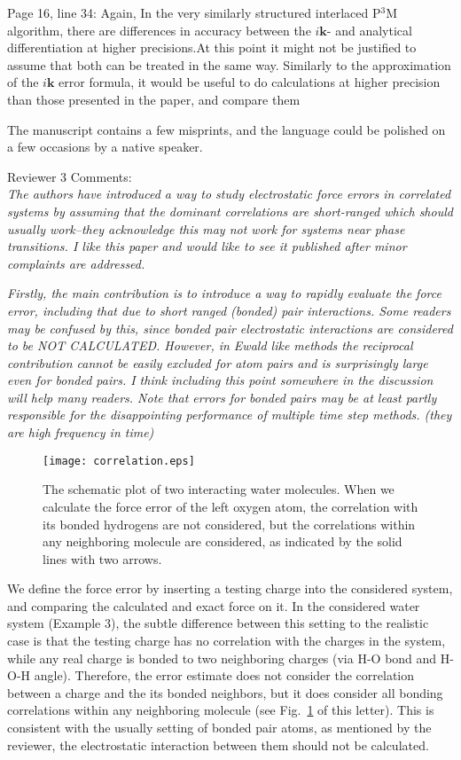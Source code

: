 \documentclass[a4paper]{article}
\begin{document}
Page 16, line 34:
Again, In the very similarly structured interlaced P$^3$M algorithm,  there are differences in accuracy between the $i\mathbf{k}$- and analytical differentiation at higher precisions.At this point it might not be justified  to assume that both can be treated in the same way. Similarly to the approximation of the $i\mathbf{k}$ error formula, it would be useful to do calculations at higher precision than those presented in the paper, and compare them

The manuscript contains a few misprints, and the language could be polished on a few occasions by a native speaker.



\vskip 1cm
\noindent
Reviewer 3 Comments:\\

\textit{
The authors have introduced a way to study electrostatic force errors
in correlated systems by assuming that the dominant correlations are
short-ranged which should usually work--they acknowledge this may not
work for systems near phase transitions. I like this paper and would
like to see it published after minor complaints are addressed.
}

\textit{
Firstly, the main contribution is to introduce a way to rapidly
evaluate the force error, including that due to short ranged (bonded)
pair interactions. Some readers may be confused by this, since bonded
pair electrostatic interactions are considered to be NOT
CALCULATED. However, in Ewald like methods the reciprocal contribution
cannot be easily excluded for atom pairs and is surprisingly large
even for bonded pairs. I think including this point somewhere in the
discussion will help many readers. Note that errors for bonded pairs
may be at least partly responsible for the disappointing performance
of multiple time step methods. (they are high frequency in time)
}

\begin{figure}
  \centering
  \texttt{[image: correlation.eps]}
  \caption{The schematic plot of two interacting water molecules.
    When we calculate the force error of the left oxygen atom, the
    correlation with its bonded hydrogens are not considered, but
    the correlations within any neighboring molecule are considered,
    as indicated by the solid lines with two arrows.}
  \label{fig:1}
\end{figure}

We define the force error by inserting a testing charge into the
considered system, and comparing the calculated and exact force on
it. In the considered water system (Example 3), the subtle difference
between this setting to the realistic case is that the testing charge
has no correlation with the charges in the system, while any real
charge is bonded to two neighboring charges (via H-O bond and H-O-H
angle).  Therefore, the error estimate does not consider the
correlation between a charge and the its bonded neighbors, but it does
consider all bonding correlations within any neighboring molecule (see
Fig.~\ref{fig:1} of this letter). This is consistent with the usually
setting of bonded pair atoms, as mentioned by the reviewer, the
electrostatic interaction between them should not be calculated.
\end{document}
